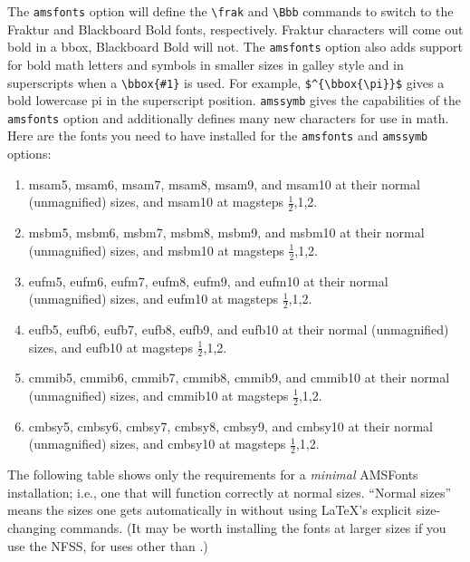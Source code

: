 The \verb+amsfonts+ option will define the \verb+\frak+ and \verb+\Bbb+
commands to switch to the Fraktur and Blackboard Bold fonts, respectively.
Fraktur characters will come out bold in a bbox, Blackboard Bold will not.
The \verb+amsfonts+ option also adds support for bold math letters and
symbols in smaller sizes in galley style and in superscripts when a
\verb+\bbox{#1}+ is used.  For example, \verb+$^{\bbox{\pi}}$+ gives a bold
lowercase pi in the superscript position. \verb+amssymb+ gives the
capabilities of the \verb+amsfonts+ option and additionally defines many
new characters for use in math. Here are the fonts you need to have
installed for the \verb+amsfonts+ and \verb+amssymb+ options:
\begin{enumerate}
\item msam5, msam6, msam7, msam8, msam9, and msam10 at their normal
(unmagnified) sizes, and msam10 at magsteps
 $\frac12$,1,2.
\item msbm5, msbm6, msbm7, msbm8, msbm9, and msbm10 at their normal
(unmagnified) sizes, and msbm10 at magsteps
 $\frac12$,1,2.
\item eufm5, eufm6, eufm7, eufm8, eufm9, and eufm10 at their normal
(unmagnified) sizes, and eufm10 at magsteps
 $\frac12$,1,2.
\item eufb5, eufb6, eufb7, eufb8, eufb9, and eufb10 at their normal
(unmagnified) sizes, and eufb10 at magsteps
 $\frac12$,1,2.
\item cmmib5, cmmib6, cmmib7, cmmib8, cmmib9, and cmmib10 at their normal
(unmagnified) sizes, and cmmib10 at magsteps
 $\frac12$,1,2.
\item cmbsy5, cmbsy6, cmbsy7, cmbsy8, cmbsy9, and cmbsy10 at their normal
(unmagnified) sizes, and cmbsy10 at magsteps
 $\frac12$,1,2.
\end{enumerate}

The following table shows only the  \REVTeX{} requirements for a {\em
minimal\/} AMSFonts installation; i.e., one that will function correctly at
normal sizes. ``Normal sizes'' means the sizes one gets automatically in
\REVTeX{} without using \LaTeX's explicit size-changing commands. (It may
be worth installing the fonts at larger sizes if you use the NFSS, for uses
other than \REVTeX{}.)

\newpage


